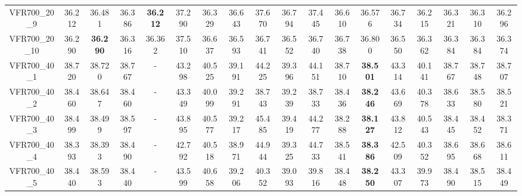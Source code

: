 \begin{tabular}{cc|ccc|ccccccccccccc}
VFR700\_20\_9      & 36.212           & 36.481           & 36.386           & {\bf 36.212}     & 37.290           & 36.329           & 36.643           & 37.670           & 36.794           & 37.445           & 36.610           & 36.576           & 36.734           & 36.215           & 36.321           & 36.310           & 36.296          \\ 
VFR700\_20\_10     & 36.290           & {\bf 36.290}     & 36.316           & 36.362           & 37.510           & 36.637           & 36.593           & 36.741           & 36.552           & 36.740           & 36.738           & 36.800           & 36.550           & 36.362           & 36.384           & 36.384           & 36.374          \\ 
VFR700\_40\_1      & 38.720           & 38.720           & 38.767           & -                & 43.298           & 40.525           & 39.191           & 44.225           & 39.396           & 44.151           & 38.710           & {\bf 38.501}     & 43.314           & 40.141           & 38.767           & 38.748           & 38.707          \\ 
VFR700\_40\_2      & 38.460           & 38.647           & 38.460           & -                & 43.349           & 40.099           & 39.291           & 38.743           & 39.239           & 38.733           & 38.436           & {\bf 38.246}     & 43.669           & 40.378           & 38.633           & 38.580           & 38.521          \\ 
VFR700\_40\_3      & 38.499           & 38.499           & 38.597           & -                & 43.895           & 40.577           & 39.217           & 45.485           & 39.419           & 44.277           & 38.288           & {\bf 38.127}     & 43.812           & 40.543           & 38.445           & 38.452           & 38.371          \\ 
VFR700\_40\_4      & 38.393           & 38.393           & 38.490           & -                & 42.792           & 40.518           & 38.971           & 44.944           & 39.325           & 44.733           & 38.541           & {\bf 38.386}     & 42.509           & 40.352           & 38.695           & 38.668           & 38.611          \\ 
VFR700\_40\_5      & 38.440           & 38.593           & 38.440           & -                & 43.599           & 40.658           & 39.206           & 40.352           & 39.093           & 39.816           & 38.448           & {\bf 38.250}     & 43.307           & 39.973           & 38.490           & 38.515           & 38.449          \\ 

\end{tabular}
